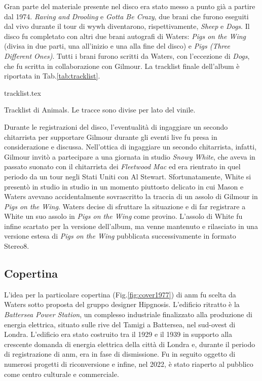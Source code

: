\documentclass[class=book, crop=false, oneside, 12pt]{standalone}
\begin{document}
    Gran parte del materiale presente nel disco era stato messo a punto già a partire dal 1974.  \emph{Raving and Drooling} e \emph{Gotta Be Crazy}, due brani che furono eseguiti dal vivo durante il tour di \acrshort{wywh} diventarono, rispettivamente, \emph{Sheep} e \emph{Dogs}. Il disco fu completato con altri due brani autografi di Waters: \emph{Pigs on the Wing} (divisa in due parti, una all'inizio e una alla fine del disco) e \emph{Pigs (Three Different Ones)}. Tutti i brani furono scritti da Waters, con l'eccezione di \emph{Dogs}, che fu scritta in collaborazione con Gilmour. La tracklist finale dell'album è riportata in Tab.\ref{tab:tracklist}.

    \begin{table}[t]
        \centering
        {tracklist.tex}
        \caption{Tracklist di Animals. Le tracce sono divise per lato del vinile.}
        \label{tab:tracklist}
    \end{table}
    
    Durante le registrazioni del disco, l'eventualità di ingaggiare un secondo chitarrista per supportare Gilmour durante gli eventi live fu presa in considerazione e discussa. Nell'ottica di ingaggiare un secondo chitarrista, infatti, Gilmour invitò a partecipare a una giornata in studio \emph{Snowy White}, che aveva in passato suonato con il chitarrista dei \emph{Fleetwood Mac} ed era rientrato in quel periodo da un tour negli Stati Uniti con Al Stewart. Sfortunatamente, White si presentò in studio in studio in un momento piuttosto delicato in cui Mason e Waters avevano accidentalmente sovrascritto la traccia di un assolo di Gilmour in \emph{Pigs on the Wing}. Waters decise di sfruttare la situazione e di far registrare a White un suo assolo in \emph{Pigs on the Wing} come provino. L'assolo di White fu infine scartato per la versione dell'album, ma venne mantenuto e rilasciato in una versione estesa di \emph{Pigs on the Wing} pubblicata successivamente in formato Stereo8.
    
    \subsection{Copertina}
    L'idea per la particolare copertina (Fig.\ref{fig:cover1977}) di \acrshort{anm} fu scelta da Waters sotto proposta del gruppo designer Hipgnosis. L'edificio ritratto è la \emph{Battersea Power Station}, un complesso industriale finalizzato alla produzione di energia elettrica, situato sulle rive del Tamigi a Battersea, nel sud-ovest di Londra. L'edificio era stato costruito tra il 1929 e il 1939 in supporto alla crescente domanda di energia elettrica della città di Londra e, durante il periodo di registrazione di \acrshort{anm}, era in fase di dismissione. Fu in seguito oggetto di numerosi progetti di riconversione e infine, nel 2022, è stato riaperto al pubblico come centro culturale e commerciale.
\end{document}

